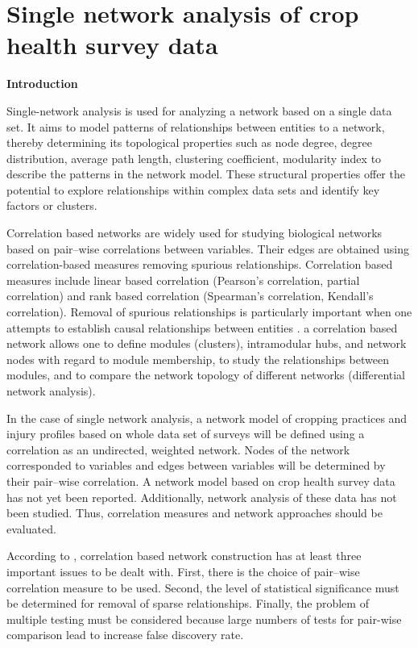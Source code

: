 \section*{Single network analysis of crop health survey data}
\textbf{Introduction}

Single-network analysis is used for analyzing a network based on a single data set. It aims to model patterns of relationships between entities to a network, thereby determining its topological properties such as node degree, degree distribution, average path length, clustering coefficient, modularity index  to describe the patterns in the network model. These structural properties offer the potential to explore relationships within complex data sets and identify key factors or clusters.

Correlation based networks are widely used for studying biological networks based on pair--wise correlations between variables. Their edges are obtained using correlation-based measures removing spurious relationships. Correlation based measures include linear based correlation (Pearson's correlation, partial correlation) and rank based correlation (Spearman's correlation, Kendall's correlation). Removal of spurious relationships is particularly important when one attempts to establish causal relationships between entities . a correlation based network allows one to define modules (clusters), intramodular hubs, and network nodes with regard to module membership, to study the relationships between modules, and to compare the network topology of different networks (differential network analysis). 

In the case of single network analysis, a network model of cropping practices and injury profiles based on whole data set of surveys will be defined using a correlation as an undirected, weighted network. Nodes of the network corresponded to variables and edges between variables will be determined by their pair--wise correlation. A network model based on crop health survey data has not yet been reported. Additionally, network analysis of these data has not been studied. Thus, correlation measures and network approaches should be evaluated.

According to , correlation based network construction has at least three important issues to be dealt with. First, there is the choice of pair--wise correlation measure to be used. Second, the level of statistical significance must be determined for removal of sparse relationships. Finally, the problem of multiple testing must be considered because large numbers of tests for pair-wise comparison lead to increase false discovery rate.


